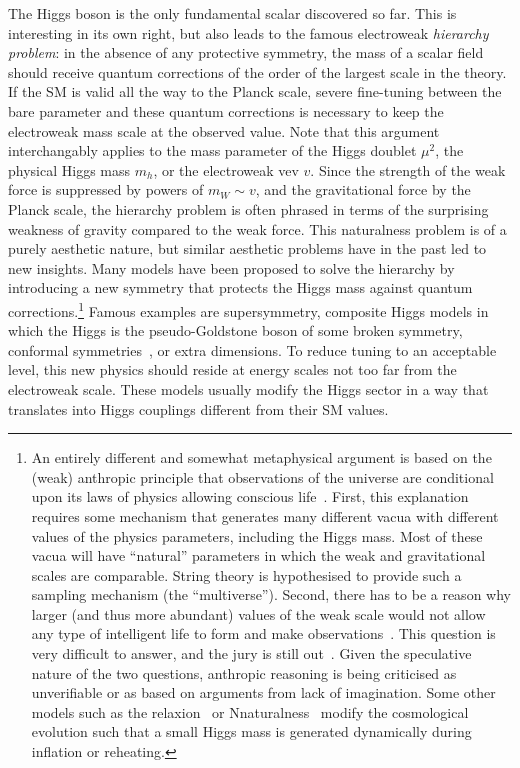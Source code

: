 The Higgs boson is the only fundamental scalar discovered so far. This
is interesting in its own right, but also leads to the famous
electroweak \emph{hierarchy problem}: in the absence of any protective
symmetry, the mass of a scalar field should receive quantum
corrections of the order of the largest scale in the theory. If the SM
is valid all the way to the Planck scale, severe fine-tuning between
the bare parameter and these quantum corrections is necessary to keep
the electroweak mass scale at the observed value. Note that this
argument interchangably applies to the mass parameter of the Higgs
doublet $\mu^2$, the physical Higgs mass $m_h$, or the electroweak vev
$v$. Since the strength of the weak force is suppressed by powers of
$m_W \sim v$, and the gravitational force by the Planck scale, the
hierarchy problem is often phrased in terms of the surprising weakness
of gravity compared to the weak force. This naturalness problem is of
a purely aesthetic nature, but similar aesthetic problems have in the
past led to new insights. Many models have been proposed to solve the
hierarchy by introducing a new symmetry that protects the Higgs mass
against quantum corrections.\footnote{An entirely different and
  somewhat metaphysical argument is based on the (weak) anthropic
  principle that observations of the universe are conditional upon its
  laws of physics allowing conscious life~\cite{Weinberg:1987dv,
    Barrow:1988yia}. First, this explanation requires some mechanism
  that generates many different vacua with different values of the
  physics parameters, including the Higgs mass. Most of these vacua
  will have ``natural'' parameters in which the weak and gravitational
  scales are comparable. String theory is hypothesised to provide such
  a sampling mechanism (the ``multiverse''). Second, there has to be a
  reason why larger (and thus more abundant) values of the weak scale
  would not allow any type of intelligent life to form and make
  observations~\cite{Agrawal:1997gf}. This question is very difficult
  to answer, and the jury is still out~\cite{Giudice:2008bi}. Given
  the speculative nature of the two questions, anthropic reasoning is
  being criticised as unverifiable or as based on arguments from lack
  of imagination. Some other models such as the
  relaxion~\cite{Graham:2015cka} or
  Nnaturalness~\cite{Arkani-Hamed:2016rle} modify the cosmological
  evolution such that a small Higgs mass is generated dynamically
  during inflation or reheating.} Famous examples are
supersymmetry, composite Higgs models in which the Higgs is the
pseudo-Goldstone boson of some broken symmetry, conformal
symmetries~\cite{Bardeen:1995kv}, or extra dimensions. To reduce
tuning to an acceptable level, this new physics should reside at
energy scales not too far from the electroweak scale. These models
usually modify the Higgs sector in a way that translates into Higgs
couplings different from their SM values.

